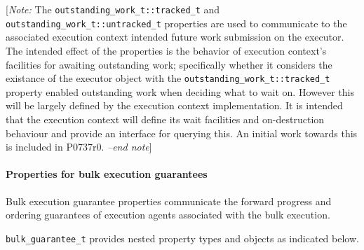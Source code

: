 \documentclass[a4paper,12pt,notitlepage,twoside,openright]{article}
\begin{document}
{[}\emph{Note:} The \texttt{outstanding_work_t::tracked_t}
and \texttt{outstanding_work_t::untracked_t} properties are
used to communicate to the associated execution context intended future
work submission on the executor. The intended effect of the properties
is the behavior of execution context's facilities for awaiting
outstanding work; specifically whether it considers the existance of the
executor object with the
\texttt{outstanding_work_t::tracked_t} property enabled
outstanding work when deciding what to wait on. However this will be
largely defined by the execution context implementation. It is intended
that the execution context will define its wait facilities and
on-destruction behaviour and provide an interface for querying this. An
initial work towards this is included in P0737r0. \emph{--end note}{]}

\hypertarget{properties-for-bulk-execution-guarantees}{%
\paragraph{Properties for bulk execution
guarantees}\label{properties-for-bulk-execution-guarantees}}

Bulk execution guarantee properties communicate the forward progress and
ordering guarantees of execution agents associated with the bulk
execution.

\texttt{bulk_guarantee_t} provides nested property types and
objects as indicated below.
\end{document}
